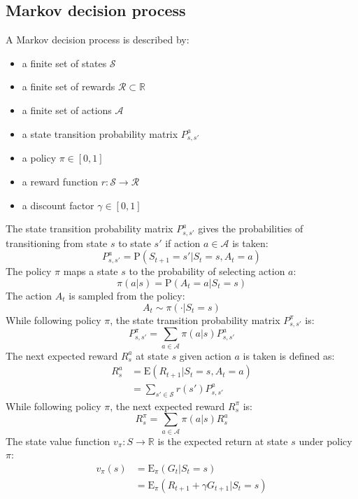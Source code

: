 \documentclass{article}
\begin{document}
\subsection{Markov decision process}
A Markov decision process is described by:
\begin{itemize}    
    \item a finite set of states $ \mathcal{S} $
    \item a finite set of rewards $ \mathcal{R} \subset \mathbb{R} $
    \item a finite set of actions $ \mathcal{A} $
    \item a state transition probability matrix $ P_{s,s'}^a $
    \item a policy $ \pi \in [0,1] $
    \item a reward function $r: \mathcal{S} \to \mathcal{R} $
    \item a discount factor $ \gamma \in [0, 1] $
\end{itemize}
The state transition probability matrix $ P_{s,s'}^a $ gives the probabilities of transitioning from state $ s $ to state $ s' $ if action $ a \in \mathcal{A} $ is taken:
\[ P_{s,s'}^a = \text{P}(S_{t+1} = s' | S_t = s, A_t = a) \]
The policy $ \pi $ maps a state $ s $ to the probability of selecting action $ a $:
\[ \pi(a | s) = \text{P}(A_t = a | S_t = s) \]
The action $ A_t $ is sampled from the policy:
\[ A_t \sim \pi( \cdot | S_t = s) \]
While following policy $ \pi $, the state transition probability matrix $ P_{s,s'}^{\pi} $ is:
\[ P_{s,s'}^{\pi} = \sum_{a \in \mathcal{A}} \pi(a | s) P_{s,s'}^a \]
The next expected reward $ R_s^a $ at state $ s $ given action $ a $ is taken is defined as:
\begin{equation*}
\begin{split}
R_s^a & = \text{E}(R_{t+1} | S_t = s, A_t = a) \\
 & = \sum_{s' \in \mathcal{S}} r(s') P_{s,s'}^a
\end{split}
\end{equation*}
While following policy $ \pi $, the next expected reward $ R_s^{\pi} $ is:
\[ R_s^{\pi} = \sum_{a \in \mathcal{A}} \pi(a | s) R_s^a \]
The state value function $ v_{\pi}: S \to \mathbb{R} $ is the expected return at state $ s $ under policy $ \pi $:
\begin{equation*}
\begin{split}
v_{\pi}(s) & = \text{E}_{\pi}(G_t | S_t = s) \\
 & = \text{E}_{\pi}(R_{t+1} + \gamma G_{t+1} | S_t = s)
\end{split}
\end{equation*}
\end{document}
